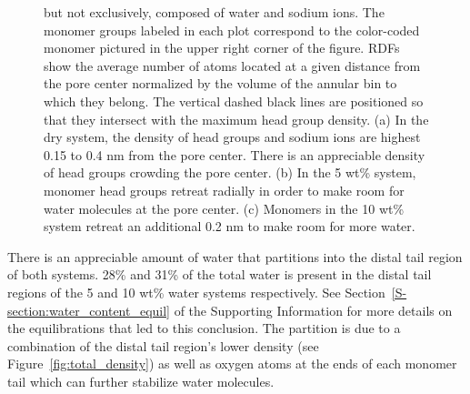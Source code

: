 \documentclass[journal=jpcbfk,manuscript=article]{achemso}
\begin{document}
\begin{figure}[!htb]
{  but not exclusively, composed of water and sodium ions. The monomer groups labeled in each plot correspond to 
  the color-coded monomer pictured in the upper right corner of the figure. 
  RDFs show the average number of atoms located at a given distance from the
  pore center normalized by the volume of the annular bin to which they belong.
  The vertical dashed black lines are positioned so that they intersect with 
  the maximum head group density.
  (a) In the dry system, the density of head groups and sodium ions are highest
  0.15 to 0.4 nm from the pore center. There is an appreciable density of head groups
  crowding the pore center. (b) In the 5 wt\% system, monomer head 
  groups retreat radially in order to make room for water molecules at the pore center.
  (c) Monomers in the 10 wt\% system retreat an additional 0.2 nm to make room
  for more water.}\label{fig:component_densities}
  \end{figure}

  There is an appreciable amount of water that partitions into the distal tail
  region of both systems. 28\% and 31\% of the total water is present in the
  distal tail regions of the 5 and 10 wt\% water systems respectively. See 
  Section~\ref{S-section:water_content_equil} of the Supporting Information 
  for more details on the equilibrations that led to this conclusion. The partition
  is due to a combination of the distal tail region's lower density (see 
  Figure~\ref{fig:total_density}) as well as oxygen atoms at the ends of each
  monomer tail which can further stabilize water molecules. 
  
\end{document}
